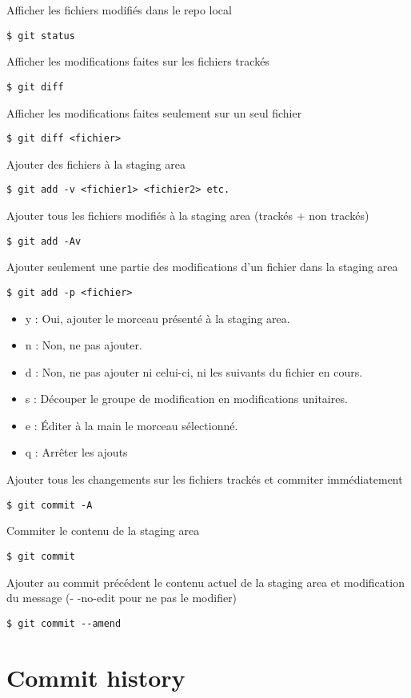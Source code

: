 \documentclass[jou,floatsintext]{apa6}
\begin{document}
Afficher les fichiers modifiés dans le repo local
\begin{lstlisting}
$ git status
\end{lstlisting}
Afficher les modifications faites sur les fichiers trackés
\begin{lstlisting}
$ git diff
\end{lstlisting}
Afficher les modifications faites seulement sur un seul fichier
\begin{lstlisting}
$ git diff <fichier>
\end{lstlisting}
Ajouter des fichiers à la staging area
\begin{lstlisting}
$ git add -v <fichier1> <fichier2> etc.
\end{lstlisting}
Ajouter tous les fichiers modifiés à la staging area (trackés + non trackés)
\begin{lstlisting}
$ git add -Av 
\end{lstlisting}
Ajouter seulement une partie des modifications d'un fichier dans la staging area
\begin{lstlisting}
$ git add -p <fichier>
\end{lstlisting}
\begin{itemize}
	\item y : Oui, ajouter le morceau présenté à la staging area.
	\item n : Non, ne pas ajouter.
	\item d : Non, ne pas ajouter ni celui-ci, ni les suivants du fichier en cours.
	\item s : Découper le groupe de modification en modifications unitaires.
	\item e : Éditer à la main le morceau sélectionné.
	\item q : Arrêter les ajouts
\end{itemize}
Ajouter tous les changements sur les fichiers trackés et commiter immédiatement
\begin{lstlisting}
$ git commit -A
\end{lstlisting}
Commiter le contenu de la staging area
\begin{lstlisting}
$ git commit 
\end{lstlisting}
Ajouter au commit précédent le contenu actuel de la staging area et modification du message (- -no-edit pour ne pas le modifier)
\begin{lstlisting}
$ git commit --amend
\end{lstlisting}

\section{Commit history}
\end{document}
